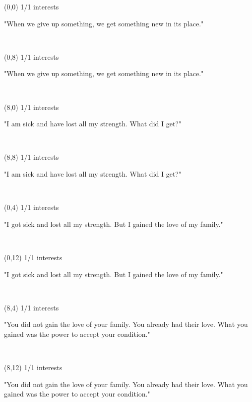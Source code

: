 \documentclass[a4paper]{article}
\newcommand{\mycard}[5]{%
	\vspace{0.1cm}
	\small #1 #2
	\par
	\parbox[t][6.7cm][c]{9.5cm}{%
	\hspace{0.1cm} \Large#3\\
	\normalsize#4 #5
	}
}
\begin{document}
\selectfont

\begin{textblock}{8}(0,0)
\mycard{1/1}{interests}{\parbox{9.0cm}{
"When we give up something, we get something new in its place."
}}{}{} 
\end{textblock}

\begin{textblock}{8}(0,8)
\mycard{1/1}{interests}{\parbox{9.0cm}{
"When we give up something, we get something new in its place."
}}{}{} 
\end{textblock}

\begin{textblock}{8}(8,0)
\mycard{1/1}{interests}{\parbox{9.0cm}{
"I am sick and have lost all my strength. What did I get?"
}}{}{} 
\end{textblock}

\begin{textblock}{8}(8,8)
\mycard{1/1}{interests}{\parbox{9.0cm}{
"I am sick and have lost all my strength. What did I get?"
}}{}{} 
\end{textblock}

\begin{textblock}{8}(0,4)
\mycard{1/1}{interests}{\parbox{9.0cm}{
"I got sick and lost all my strength. But I gained the love of my family."
}}{}{} 
\end{textblock}

\begin{textblock}{8}(0,12)
\mycard{1/1}{interests}{\parbox{9.0cm}{
"I got sick and lost all my strength. But I gained the love of my family."
}}{}{} 
\end{textblock}

\begin{textblock}{8}(8,4)
\mycard{1/1}{interests}{\parbox{9.0cm}{
"You did not gain the love of your family. You already had their love. What you gained was the power to accept your condition."
}}{}{} 
\end{textblock}

\begin{textblock}{8}(8,12)
\mycard{1/1}{interests}{\parbox{9.0cm}{
"You did not gain the love of your family. You already had their love. What you gained was the power to accept your condition."
}}{}{} 
\end{textblock}
\end{document}
